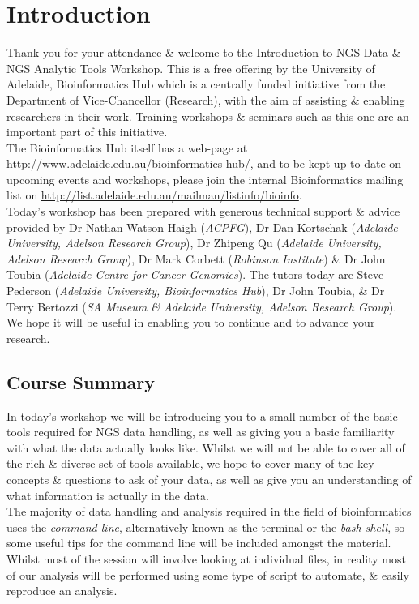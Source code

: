 \chapter{Introduction}

Thank you for your attendance \& welcome to the Introduction to NGS Data \& NGS Analytic Tools Workshop.
This is a free offering by the University of Adelaide, Bioinformatics Hub which is a centrally funded initiative from the Department of Vice-Chancellor (Research), with the aim of assisting \& enabling researchers in their work.
Training workshops \& seminars such as this one  are an important part of this initiative. \\

The Bioinformatics Hub itself has a web-page at \url{http://www.adelaide.edu.au/bioinformatics-hub/}, and to be kept up to date on upcoming events and workshops, please join the internal Bioinformatics mailing list on \url{http://list.adelaide.edu.au/mailman/listinfo/bioinfo}.\\

Today's workshop has been prepared with generous technical support \& advice provided by Dr Nathan Watson-Haigh (\textit{ACPFG}), Dr Dan Kortschak (\textit{Adelaide University, Adelson Research Group}), Dr Zhipeng Qu (\textit{Adelaide University, Adelson Research Group}), Dr Mark Corbett (\textit{Robinson Institute}) \& Dr John Toubia (\textit{Adelaide Centre for Cancer Genomics}). 
The tutors today are Steve Pederson (\textit{Adelaide University, Bioinformatics Hub}), Dr John Toubia, \& Dr Terry Bertozzi (\textit{SA Museum \& Adelaide University, Adelson Research Group}). 
We hope it will be useful in enabling you to continue and to advance your research.\\

\section{Course Summary}
In today's workshop we will be introducing you to a small number of the basic tools required for NGS data handling, as well as giving you a basic familiarity with what the data actually looks like.
Whilst we will not be able to cover all of the rich \& diverse set of tools available, we hope to cover many of the key concepts \& questions to ask of your data, as well as give you an understanding of what information is actually in the data.\\

The majority of data handling and analysis required in the field of bioinformatics uses the \textit{command line}, alternatively known as the terminal or the \textit{bash shell}, so some useful tips for the command line will be included amongst the material.
Whilst most of the session will involve looking at individual files, in reality most of our analysis will be performed using some type of script to automate, \& easily reproduce an analysis. \\


